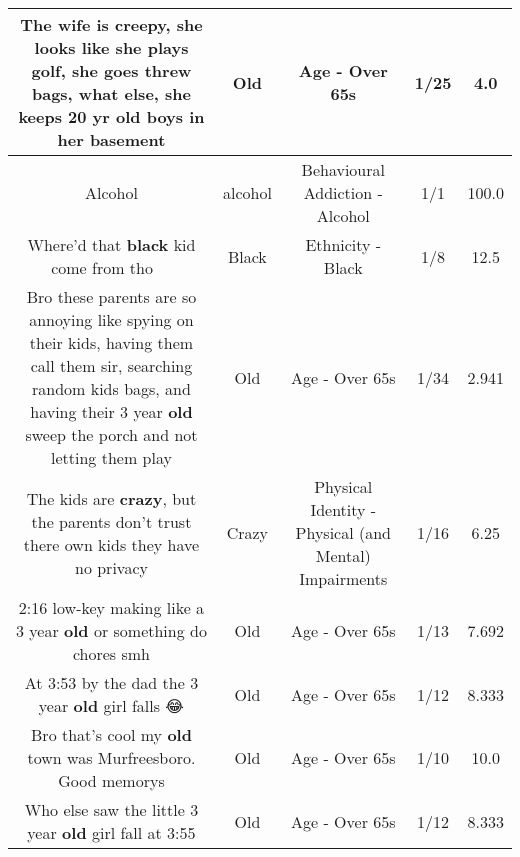 \documentclass[11pt]{article}
\newlength\mylength
\begin{document}
\begin{center}
\begin{longtable}{|C{.65\mylength}|C{.30\mylength}|C{.12\mylength}|C{.12\mylength}|C{.12\mylength}|}
  \small The wife is creepy, she looks like she plays golf, she goes threw bags, what else, she keeps 20 yr \textbf{old} boys in her basement\normalsize   & Old & Age - Over 65s & 1/25 & 4.0 \\  \hline
  \small Alcohol\normalsize   & alcohol & Behavioural Addiction - Alcohol & 1/1 & 100.0 \\  \hline
  \small Where'd that \textbf{black} kid come from tho 🤔🤔🤔\normalsize   & Black & Ethnicity - Black & 1/8 & 12.5 \\  \hline
  \small Bro these parents are so annoying like spying on their kids, having them call them sir, searching random kids bags, and having their 3 year \textbf{old} sweep the porch and not letting them play\normalsize   & Old & Age - Over 65s & 1/34 & 2.941 \\  \hline
  \small The kids are \textbf{crazy}, but the parents don't trust there own kids they have no privacy\normalsize   & Crazy & Physical Identity - Physical (and Mental) Impairments & 1/16 & 6.25 \\  \hline
  \small 2:16 low-key making like a 3 year \textbf{old} or something do chores smh\normalsize   & Old & Age - Over 65s & 1/13 & 7.692 \\  \hline
  \small At 3:53 by the dad the 3 year \textbf{old} girl falls 😂\normalsize   & Old & Age - Over 65s & 1/12 & 8.333 \\  \hline
  \small Bro that's cool my \textbf{old} town was Murfreesboro. Good memorys\normalsize   & Old & Age - Over 65s & 1/10 & 10.0 \\  \hline
  \small Who else saw the little 3 year \textbf{old} girl fall at  3:55\normalsize   & Old & Age - Over 65s & 1/12 & 8.333 \\  \hline

\end{longtable}
\end{center}
\end{document}
